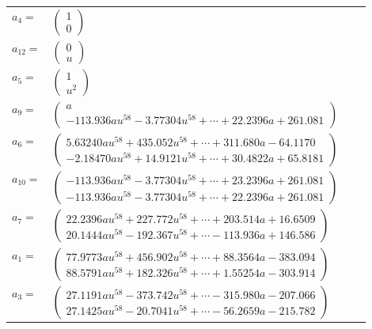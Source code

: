 \documentclass[1p]{elsarticle_modified}
\theoremstyle{definition}
\begin{document}
\begin{tabular}{m{7pt} m{180pt} m{7pt} m{180pt} }
\flushright $a_{4}=$&$\begin{pmatrix}1\\0\end{pmatrix}$ \\
\flushright $a_{12}=$&$\begin{pmatrix}0\\u\end{pmatrix}$ \\
\flushright $a_{5}=$&$\begin{pmatrix}1\\u^2\end{pmatrix}$ \\
\flushright $a_{9}=$&$\begin{pmatrix}a\\-113.936 a u^{58}-3.77304 u^{58}+\cdots+22.2396 a+261.081\end{pmatrix}$ \\
\flushright $a_{6}=$&$\begin{pmatrix}5.63240 a u^{58}+435.052 u^{58}+\cdots+311.680 a-64.1170\\-2.18470 a u^{58}+14.9121 u^{58}+\cdots+30.4822 a+65.8181\end{pmatrix}$ \\
\flushright $a_{10}=$&$\begin{pmatrix}-113.936 a u^{58}-3.77304 u^{58}+\cdots+23.2396 a+261.081\\-113.936 a u^{58}-3.77304 u^{58}+\cdots+22.2396 a+261.081\end{pmatrix}$ \\
\flushright $a_{7}=$&$\begin{pmatrix}22.2396 a u^{58}+227.772 u^{58}+\cdots+203.514 a+16.6509\\20.1444 a u^{58}-192.367 u^{58}+\cdots-113.936 a+146.586\end{pmatrix}$ \\
\flushright $a_{1}=$&$\begin{pmatrix}77.9773 a u^{58}+456.902 u^{58}+\cdots+88.3564 a-383.094\\88.5791 a u^{58}+182.326 u^{58}+\cdots+1.55254 a-303.914\end{pmatrix}$ \\
\flushright $a_{3}=$&$\begin{pmatrix}27.1191 a u^{58}-373.742 u^{58}+\cdots-315.980 a-207.066\\27.1425 a u^{58}-20.7041 u^{58}+\cdots-56.2659 a-215.782\end{pmatrix}$ \\

\end{tabular}
\end{document}
